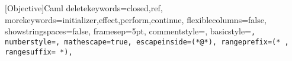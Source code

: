 
\newcommand{\ocamlcommentstyle}{\color{blue}}

[Objective]{Caml}{
  deletekeywords={closed,ref},
  morekeywords={initializer,effect,perform,continue},
  flexiblecolumns=false,
  showstringspaces=false,
  framesep=5pt,
  commentstyle=\ocamlcommentstyle,
  basicstyle=\tt\small,
  numberstyle=\footnotesize,
  mathescape=true,
  escapeinside={(*@}{*)},
  rangeprefix=(*\ ,%
  rangesuffix=\ *),%
}

\def\oc|#1|{\text{\lstinline[language=ocaml,basicstyle=\tt,flexiblecolumns=true]|#1|}}

\def\qoc|#1|{``\oc|#1|''}


